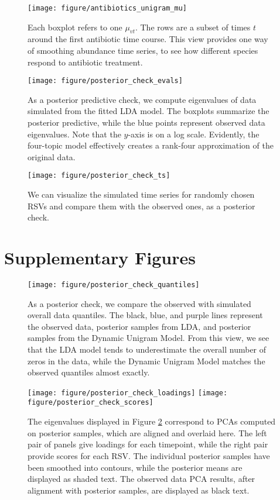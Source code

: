 \documentclass[oupdraft]{bio}
\begin{document}
\begin{figure}[!p]
  \centering
  \texttt{[image: figure/antibiotics\_unigram\_mu]}
  \caption{Each boxplot refers to one $\mu_{vt}$. The rows are a subset of times
    $t$ around the first antibiotic time course. This view provides one way of
    smoothing abundance time series, to see how different species respond to
    antibiotic treatment. \label{fig:antibiotics_unigram_theta} }
\end{figure}

\begin{figure}[!p]
  \centering
  \texttt{[image: figure/posterior\_check\_evals]}
  \caption{As a posterior predictive check, we compute eigenvalues of data
    simulated from the fitted LDA model. The boxplots summarize the posterior
    predictive, while the blue points represent observed data eigenvalues. Note
    that the $y$-axis is on a log scale. Evidently, the four-topic model
    effectively creates a rank-four approximation of the original
    data. \label{fig:antibiotics_posterior_evals}}
\end{figure}

\begin{figure}[!p]
  \centering
  \texttt{[image: figure/posterior\_check\_ts]}
  \caption{We can visualize the simulated time series for randomly chosen RSVs
    and compare them with the observed ones, as a posterior check.
    \label{fig:antibiotics_posterior_ts}}
\end{figure}


\section{Supplementary Figures}

\begin{figure}[!p]
  \centering
  \texttt{[image: figure/posterior\_check\_quantiles]}
  \caption{As a posterior check, we compare the observed with simulated overall
    data quantiles. The black, blue, and purple lines represent the observed
    data, posterior samples from LDA, and posterior samples from the Dynamic
    Unigram Model. From this view, we see that the LDA model tends to
    underestimate the overall number of zeros in the data, while the Dynamic
    Unigram Model matches the observed quantiles almost
    exactly. \label{fig:antibiotics_posterior_quantiles} }
\end{figure}


\begin{figure}[!p]
  \centering
  \texttt{[image: figure/posterior\_check\_loadings]}
  \texttt{[image: figure/posterior\_check\_scores]}
  \caption{The eigenvalues displayed in Figure
    \ref{fig:antibiotics_posterior_evals} correspond to PCAs computed on
    posterior samples, which are aligned and overlaid here. The left pair of
    panels give loadings for each timepoint, while the right pair provide scores
    for each RSV. The individual posterior samples have been smoothed into
    contours, while the posterior means are displayed as shaded text. The
    observed data PCA results, after alignment with posterior samples, are
    displayed as black text. \label{fig:antibiotics_posterior_pca} }
\end{figure}
\end{document}
